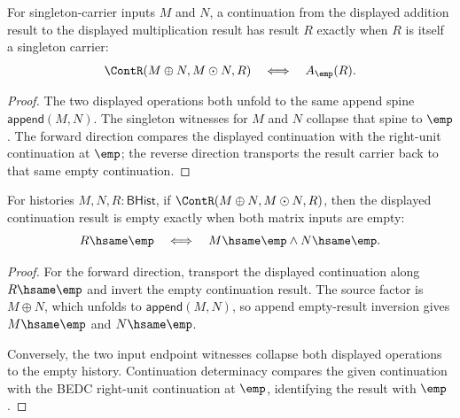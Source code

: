 \begin{theorem}
\label{thm:matrix-singleton-addmul-continuation-result-iff}
For singleton-carrier inputs $M$ and $N$, a continuation from the displayed
addition result to the displayed multiplication result has result $R$ exactly
when $R$ is itself a singleton carrier:
$$
\ContR(M\oplus N,M\odot N,R)
\quad\Longleftrightarrow\quad
A_{\emp}(R).
$$
\end{theorem}
\begin{proof}
The two displayed operations both unfold to the same append spine
$\mathsf{append}(M,N)$. The singleton witnesses for $M$ and $N$ collapse that
spine to $\emp$. The forward direction compares the displayed continuation
with the right-unit continuation at $\emp$; the reverse direction transports
the result carrier back to that same empty continuation.
\end{proof}

\begin{theorem}
\label{thm:matrix-singleton-addmul-continuation-empty-result-factors}
For histories $M,N,R:\mathsf{BHist}$, if
$\ContR(M\oplus N,M\odot N,R)$, then the displayed continuation result is
empty exactly when both matrix inputs are empty:
$$
R\hsame\emp
\quad\Longleftrightarrow\quad
M\hsame\emp\land N\hsame\emp.
$$
\end{theorem}
\begin{proof}
For the forward direction, transport the displayed continuation along
$R\hsame\emp$ and invert the empty continuation result. The source factor is
$M\oplus N$, which unfolds to $\mathsf{append}(M,N)$, so append empty-result
inversion gives $M\hsame\emp$ and $N\hsame\emp$.

Conversely, the two input endpoint witnesses collapse both displayed
operations to the empty history. Continuation determinacy compares the given
continuation with the BEDC right-unit continuation at $\emp$, identifying the
result with $\emp$.
\end{proof}


